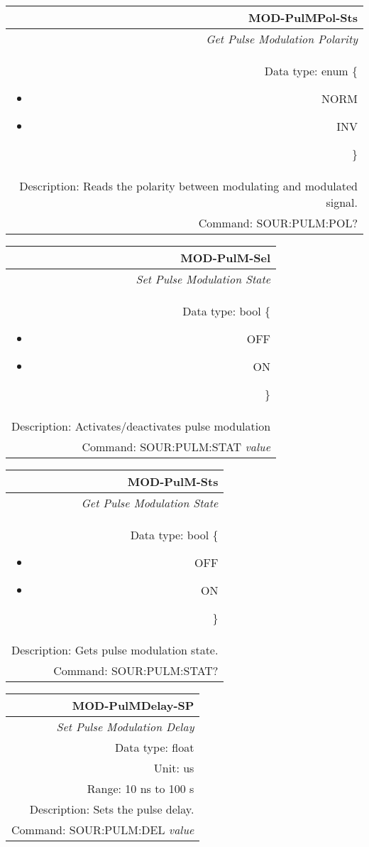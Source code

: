 \documentclass[openany]{article}
\begin{document}
		\begin{tabular}{N}
			\hline
			\bfseries MOD-PulMPol-Sts \\ \hline
			\emph{Get Pulse Modulation Polarity} \\
			Data type: enum \{\begin{itemize}[noitemsep]
				\small
				\item[] NORM
				\item[] INV
			\end{itemize}\} \\ 
			Description: Reads the polarity between modulating and modulated signal. \\
			Command: SOUR:PULM:POL? \\

		\end{tabular}
%
		\begin{tabular}{N}
			\hline
			\bfseries MOD-PulM-Sel \\ \hline
			\emph{Set Pulse Modulation State} \\
			Data type: bool \{\begin{itemize}[noitemsep]
				\small
				\item[] OFF
				\item[] ON
			\end{itemize}\} \\
			Description: Activates/deactivates pulse modulation\\
			Command: SOUR:PULM:STAT \emph{value} \\

		\end{tabular}


		\begin{tabular}{N}
			\hline
			\bfseries MOD-PulM-Sts \\ \hline
			\emph{Get Pulse Modulation State} \\
			Data type: bool \{\begin{itemize}[noitemsep]
				\small
				\item[] OFF
				\item[] ON
			\end{itemize}\} \\
			Description: Gets pulse modulation state. \\
			Command: SOUR:PULM:STAT? \\
			
		\end{tabular}
%
		\begin{tabular}{N}
			\hline
			\bfseries MOD-PulMDelay-SP \\ \hline
			\emph{Set Pulse Modulation Delay} \\
			Data type: float \\
			Unit: us \\ 
			Range: 10 ns to 100 s \\
			Description: Sets the pulse delay. \\
			Command: SOUR:PULM:DEL \emph{value} \\
			
		\end{tabular}
\end{document}
